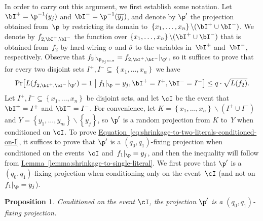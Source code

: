 \documentclass[11pt]{article}
\numberwithin{equation}{section}
\newtheorem{proposition}[theorem]{Proposition}
\theoremstyle{definition}
\theoremstyle{plain}
\newcommand{\expref}[2]{\hyperref[#2]{#1~\ref{#2}}}
\theoremstyle{definition}\newtheorem{notation}[theorem]{Notation}\theoremstyle{plain}
\begin{document}
In order to carry out this argument, we first establish some notation.
Let $\bI^{+}=\p^{-1}(y_{j})$ and $\bI^{-}=\p^{-1}(\overline{y_{j}})$,
and denote by $\p'$ the projection obtained from~$\p$ by restricting
its domain to~$\left\{ x_{1},\ldots,x_{n}\right\} \backslash(\bI^{+}\cup\bI^{-})$.
We denote by $f_{2,\bI^{+},\bI^{-}}$ the function over $\left\{ x_{1},\ldots,x_{n}\right\} \backslash(\bI^{+}\cup\bI^{-})$
that is obtained from~$f_{2}$ by hard-wiring $\sigma$ and $\overline{\sigma}$
to the variables in~$\bI^{+}$ and~$\bI^{-}$, respectively. Observe
that $f_{2}|_{\p_{y_{j}\gets\sigma}}=f_{2,\bI^{+},\bI^{-}}|_{\p'}$,
so it suffices to prove that for every two disjoint sets $I^{+},I^{-}\subseteq\left\{ x_{1},\ldots,x_{n}\right\} $
we have 
\begin{equation}
\Pr\!\left[L(f_{2,\bI^{+},\bI^{-}}|_{\p'})=1\;\middle|\;f_{1}|_{\p}=y_{j},\bI^{+}=I^{+},\bI^{-}=I^{-}\right]\le q\cdot\sqrt{L(f_{2})}.\label{eq:shrinkage-to-two-literals-conditioned-on-I}
\end{equation}
Let $I^{+},I^{-}\subseteq\left\{ x_{1},\ldots,x_{n}\right\} $ be
disjoint sets, and let $\cI$ be the event that $\bI^{+}=I^{+}$ and
$\bI^{-}=I^{-}$. For convenience, let $K=\left\{ x_{1},\ldots,x_{n}\right\} \backslash(I^{+}\cup I^{-})$
and $Y=\left\{ y_{1},\ldots,y_{m}\right\} \backslash\left\{ y_{j}\right\} $,
so $\p'$ is a random projection from $K$ to~$Y$ when conditioned
on $\cI$. To prove \expref{Equation}{eq:shrinkage-to-two-literals-conditioned-on-I},
it suffices to prove that $\p'$ is a $(q_{0},q_{1})$-fixing projection
when conditioned on the events~$\cI$ and~$f_{1}|_{\p}=y_{j}$,
and then the inequality will follow from \expref{Lemma}{lemma:shrinkage-to-single-literal}.
We first prove that $\p'$ is a $(q_{0},q_{1})$-fixing projection
when conditioning only on the event~$\cI$ (and not on $f_{1}|_{\p}=y_{j}$). 
\begin{proposition}
Conditioned on the event $\cI$, the projection $\p'$ is a $(q_{0},q_{1})$-fixing
projection. 
\end{proposition}
\end{document}
